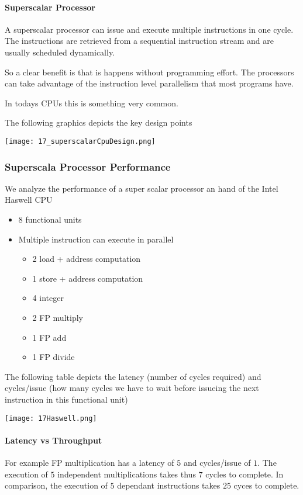 \paragraph{Superscalar Processor}
A superscalar processor can issue and execute multiple instructions in one cycle. The instructions are retrieved from a sequential instruction stream and are usually scheduled dynamically.

So a clear benefit is that is happens without programming effort. The processors can take advantage of the instruction level parallelism that most programs have.

In todays CPUs this is something very common.

The following graphics depicts the key design points

\texttt{[image: 17\_superscalarCpuDesign.png]}

\subsubsection{Superscala Processor Performance}
We analyze the performance of a super scalar processor an hand of the Intel Haswell CPU
\begin{itemize}
    \item 8 functional units
    \item Multiple instruction can execute in parallel
        \begin{itemize}
            \item 2 load + address computation
            \item 1 store + address computation
            \item 4 integer
            \item 2 FP multiply
            \item 1 FP add
            \item 1 FP divide
        \end{itemize}
\end{itemize}

The following table depicts the latency (number of cycles required) and cycles/issue (how many cycles we have to wait before issueing the next instruction in this functional unit)

\texttt{[image: 17Haswell.png]}

\paragraph{Latency vs Throughput}
For example FP multiplication has a latency of $5$ and cycles/issue of $1$. The execution of $5$ independent multiplications takes thus $7$ cycles to complete. In comparison, the execution of $5$ dependant instructions takes $25$ cyces to complete.


